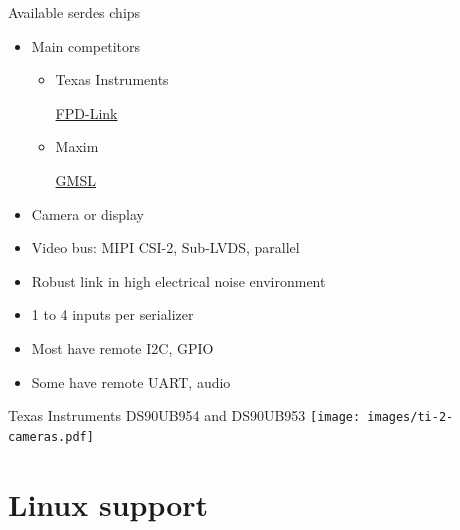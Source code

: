 \documentclass[xetex,table,aspectratio=169]{beamer}
\newcommand{\myhref}[2]{
  \href{#1}{#2 {\tiny\faExternalLink{}}}
}
\begin{document}
\begin{frame}{Available serdes chips}
  \begin{itemize}
  \item Main competitors
    \begin{itemize}
    \item Texas Instruments
      \myhref{https://www.ti.com/interface/fpd-link-serdes/products.html}{FPD-Link}
    \item Maxim
      \myhref{https://www.maximintegrated.com/en/products/interface/high-speed-signaling/gmsl-serdes.html}{GMSL}
    \end{itemize}
  \item Camera or display
  \item Video bus: MIPI CSI-2, Sub-LVDS, parallel
  \item Robust link in high electrical noise environment
  \item 1 to 4 inputs per serializer
  \item Most have remote I2C, GPIO
  \item Some have remote UART, audio
  \end{itemize}
\end{frame}

\begin{frame}{Texas Instruments DS90UB954 and DS90UB953}
  \center\texttt{[image: images/ti-2-cameras.pdf]}
\end{frame}


\section{Linux support}
\end{document}
